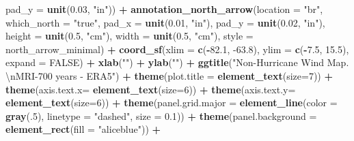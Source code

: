 \documentclass[12pt,oneside]{reedthesis}
\newenvironment{Shaded}{\begin{snugshade}}{\end{snugshade}}
\newcommand{\CharTok}[1]{\textcolor[rgb]{0.31,0.60,0.02}{#1}}
\newcommand{\DataTypeTok}[1]{\textcolor[rgb]{0.13,0.29,0.53}{#1}}
\newcommand{\DecValTok}[1]{\textcolor[rgb]{0.00,0.00,0.81}{#1}}
\newcommand{\FloatTok}[1]{\textcolor[rgb]{0.00,0.00,0.81}{#1}}
\newcommand{\KeywordTok}[1]{\textcolor[rgb]{0.13,0.29,0.53}{\textbf{#1}}}
\newcommand{\NormalTok}[1]{#1}
\newcommand{\OperatorTok}[1]{\textcolor[rgb]{0.81,0.36,0.00}{\textbf{#1}}}
\newcommand{\OtherTok}[1]{\textcolor[rgb]{0.56,0.35,0.01}{#1}}
\newcommand{\StringTok}[1]{\textcolor[rgb]{0.31,0.60,0.02}{#1}}
\begin{document}
\begin{Shaded}
\begin{Highlighting}[]
   \DataTypeTok{pad_y =} \KeywordTok{unit}\NormalTok{(}\FloatTok{0.03}\NormalTok{, }\StringTok{"in"}\NormalTok{)) }\OperatorTok{+}\StringTok{ }
\StringTok{  }\KeywordTok{annotation_north_arrow}\NormalTok{(}\DataTypeTok{location =} \StringTok{"br"}\NormalTok{, }\DataTypeTok{which_north =} \StringTok{"true"}\NormalTok{, }\DataTypeTok{pad_x =} \KeywordTok{unit}\NormalTok{(}\FloatTok{0.01}\NormalTok{, }\StringTok{"in"}\NormalTok{), }\DataTypeTok{pad_y =} \KeywordTok{unit}\NormalTok{(}\FloatTok{0.02}\NormalTok{, }\StringTok{"in"}\NormalTok{), }\DataTypeTok{height =} \KeywordTok{unit}\NormalTok{(}\FloatTok{0.5}\NormalTok{, }\StringTok{"cm"}\NormalTok{), }
   \DataTypeTok{width =} \KeywordTok{unit}\NormalTok{(}\FloatTok{0.5}\NormalTok{, }\StringTok{"cm"}\NormalTok{), }\DataTypeTok{style =}\NormalTok{ north_arrow_minimal) }\OperatorTok{+}
\StringTok{  }\KeywordTok{coord_sf}\NormalTok{(}\DataTypeTok{xlim =} \KeywordTok{c}\NormalTok{(}\OperatorTok{-}\FloatTok{82.1}\NormalTok{, }\FloatTok{-63.8}\NormalTok{), }\DataTypeTok{ylim =} \KeywordTok{c}\NormalTok{(}\OperatorTok{-}\FloatTok{7.5}\NormalTok{, }\FloatTok{15.5}\NormalTok{), }\DataTypeTok{expand =} \OtherTok{FALSE}\NormalTok{) }\OperatorTok{+}
\StringTok{  }\KeywordTok{xlab}\NormalTok{(}\StringTok{""}\NormalTok{) }\OperatorTok{+}\StringTok{ }
\StringTok{  }\KeywordTok{ylab}\NormalTok{(}\StringTok{""}\NormalTok{) }\OperatorTok{+}\StringTok{ }
\StringTok{  }\KeywordTok{ggtitle}\NormalTok{(}\StringTok{"Non-Hurricane Wind Map. }\CharTok{\textbackslash{}n}\StringTok{MRI-700 years - ERA5"}\NormalTok{) }\OperatorTok{+}\StringTok{ }
\StringTok{  }\KeywordTok{theme}\NormalTok{(}\DataTypeTok{plot.title =} \KeywordTok{element_text}\NormalTok{(}\DataTypeTok{size=}\DecValTok{7}\NormalTok{)) }\OperatorTok{+}
\StringTok{  }\KeywordTok{theme}\NormalTok{(}\DataTypeTok{axis.text.x=} \KeywordTok{element_text}\NormalTok{(}\DataTypeTok{size=}\DecValTok{6}\NormalTok{)) }\OperatorTok{+}\StringTok{ }
\StringTok{  }\KeywordTok{theme}\NormalTok{(}\DataTypeTok{axis.text.y=} \KeywordTok{element_text}\NormalTok{(}\DataTypeTok{size=}\DecValTok{6}\NormalTok{)) }\OperatorTok{+}
\StringTok{  }\KeywordTok{theme}\NormalTok{(}\DataTypeTok{panel.grid.major =} \KeywordTok{element_line}\NormalTok{(}\DataTypeTok{color =} \KeywordTok{gray}\NormalTok{(.}\DecValTok{5}\NormalTok{), }\DataTypeTok{linetype =} \StringTok{"dashed"}\NormalTok{, }\DataTypeTok{size =} \FloatTok{0.1}\NormalTok{)) }\OperatorTok{+}
\StringTok{  }\KeywordTok{theme}\NormalTok{(}\DataTypeTok{panel.background =} \KeywordTok{element_rect}\NormalTok{(}\DataTypeTok{fill =} \StringTok{"aliceblue"}\NormalTok{)) }\OperatorTok{+}

\end{Highlighting}
\end{Shaded}
\end{document}

